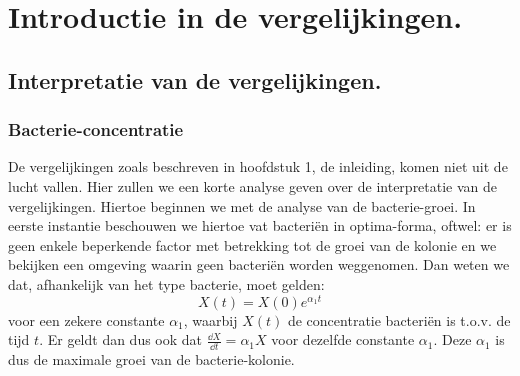 

\chapter{Introductie in de vergelijkingen.} 			%
\label{Introductie_vergelijkingen}

\section{Interpretatie van de vergelijkingen.}

\subsection*{Bacterie-concentratie}
De vergelijkingen zoals beschreven in hoofdstuk 1, de inleiding, komen niet uit de lucht vallen. Hier zullen we een korte analyse geven over de interpretatie van de vergelijkingen. Hiertoe beginnen we met de analyse van de bacterie-groei. In eerste instantie beschouwen we hiertoe vat bacteri\"en in optima-forma, oftwel: er is geen enkele beperkende factor met betrekking tot de groei van de kolonie en we bekijken een omgeving waarin geen bacteri\"en worden weggenomen. Dan weten we dat, afhankelijk van het type bacterie, moet gelden:
\begin{equation*}
	X(t) = X(0) e^{\alpha_1t} 		
\end{equation*}
voor een zekere constante $\alpha_1$, waarbij $X(t)$ de concentratie bacteri\"en is t.o.v. de tijd $t$. Er geldt dan dus ook dat $\tfrac{\dd X}{\dd t} = \alpha_1 X$ voor dezelfde constante $\alpha_1$. Deze $\alpha_1$ is dus de maximale groei van de bacterie-kolonie. 

